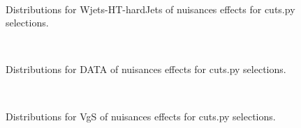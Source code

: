 \begin{figure}[htbp]  
\centering 
\\ 
\caption{ 
   Distributions for Wjets-HT-hardJets of nuisances effects for cuts.py selections.
} 
\label{fig:Wjets_HT_hardJets_cuts.py} 
\end{figure} 




\begin{figure}[htbp]  
\centering 
\\ 
\caption{ 
   Distributions for DATA of nuisances effects for cuts.py selections.
} 
\label{fig:DATA_cuts.py} 
\end{figure} 




\begin{figure}[htbp]  
\centering 
\\ 
\caption{ 
   Distributions for VgS of nuisances effects for cuts.py selections.
} 
\label{fig:VgS_cuts.py} 
\end{figure} 



